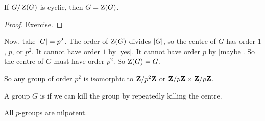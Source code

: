 \documentclass[11pt, twoside]{amsart}
\begin{document}
\begin{proposition}\label{maybe}
If $G/\operatorname{Z}(G)$ is cyclic, then $G=\operatorname{Z}(G)$.
\end{proposition}
\begin{proof}
Exercise.
\end{proof}

Now, take $\left \lvert G \right \rvert = p^2$. The order of $\operatorname{Z}(G)$ divides $\left \lvert G \right \rvert$, so the centre of $G$ has order $1$, $p$, or $p^2$. It cannot have order $1$ by \cref{yes}. It cannot have order $p$ by \cref{maybe}. So the centre of $G$ must have order $p^2$. So $\operatorname{Z}(G) = G$.

So any group of order $p^2$ is isomorphic to $\mathbf{Z}/p^2\mathbf{Z}$ or $\mathbf{Z} /p\mathbf{Z}\times \mathbf{Z}/p\mathbf{Z}$. 

\begin{definition}
A group $G$ is  if we can kill the group by repeatedly killing the centre.
\end{definition}

\begin{corollary}\label{nilp}
All $p$-groups are nilpotent.
\end{corollary}
\end{document}
